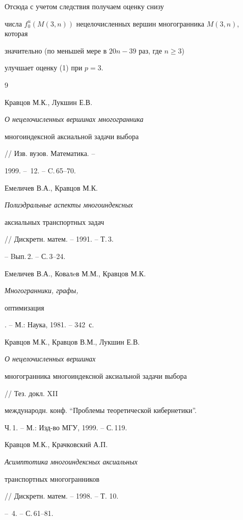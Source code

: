 Отсюда с учетом следствия получаем оценку снизу


числа $f^u_0(M(3,n))$ нецелочисленных вершин многогранника $M(3,n)$, которая


значительно (по меньшей мере в $20n-39$ раз, где $n\geq 3$)


улучшает оценку (1) при $p=3$.





\begin{thebibliography}{9}







Кравцов М.К., Лукшин Е.В. {\em О нецелочисленных вершинах многогранника


многоиндексной аксиальной задачи выбора} // Изв. вузов. Математика. --


1999. -- \No\,12. -- C.\,65--70.




Емеличев В.А., Кравцов М.К. {\em Полиэдральные аспекты многоиндексных


аксиальных транспортных задач} // Дискретн. матем. -- 1991. -- Т.\,3.


-- Bып.\,2. -- С.\,3--24.




Емеличев В.А., Ковалeв М.М., Кравцов М.К. {\em Многогранники, графы,


оптимизация}. -- М.: Наука, 1981. -- 342~с.




Кравцов М.К., Кравцов В.М., Лукшин Е.В. {\em О нецелочисленных вершинах


многогранника многоиндексной аксиальной задачи выбора} // Тез. докл. XII


международн. конф. ``Проблемы теоретической кибернетики''.


Ч.\,1. -- М.: Изд-во МГУ, 1999. -- С.\,119.




Кравцов М.К., Крачковский А.П. {\em Асимптотика многоиндексных аксиальных


транспортных многогранников} // Дискретн. матем. -- 1998. -- Т. 10.


-- \No\,4. -- С.\,61--81.





\end{thebibliography}





